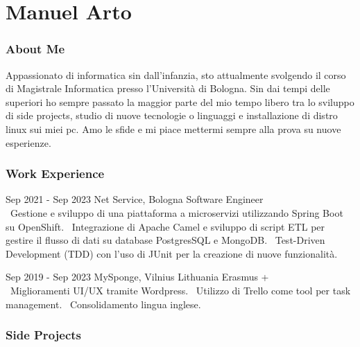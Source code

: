\documentclass{tccv}
\begin{document}
\part{Manuel Arto}

\section{About Me}

Appassionato di informatica sin dall'infanzia, sto attualmente svolgendo il corso di Magistrale Informatica presso l'Università di Bologna. Sin dai tempi delle superiori ho sempre passato la maggior parte del mio tempo libero tra lo sviluppo di side projects, studio di nuove tecnologie o linguaggi e installazione di distro linux sui miei pc. Amo le sfide e mi piace mettermi sempre alla prova su nuove esperienze.


\section{Work Experience}

\begin{eventlist}

\item{Sep 2021 - Sep 2023}
     {Net Service, Bologna}
     {Software Engineer} \\
\textbullet~Gestione e sviluppo di una piattaforma a microservizi utilizzando Spring Boot su OpenShift. \newline
\textbullet~Integrazione di Apache Camel e sviluppo di script ETL per gestire il flusso di dati su database PostgresSQL e MongoDB. \newline
\textbullet~Test-Driven Development (TDD) con l'uso di JUnit per la creazione di nuove funzionalità.

\item{Sep 2019 - Sep 2023}
     {MySponge, Vilnius Lithuania}
     {Erasmus +} \\
\textbullet~Miglioramenti UI/UX tramite Wordpress. \newline
\textbullet~Utilizzo di Trello come tool per task management. \newline
\textbullet~Consolidamento lingua inglese.
\end{eventlist}


\section{Side Projects}
\end{document}
